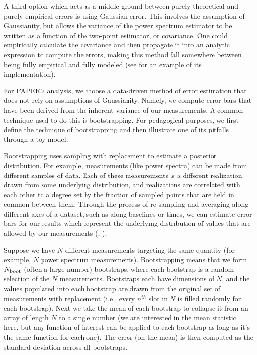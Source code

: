 \documentclass[preprint2,numberedappendix,tighten]{aastex6}  %
\begin{document}
A third option which acts as a middle ground between purely theoretical and purely empirical errors is using Gaussian error. This involves the assumption of Gaussianity, but allows the variance of the power spectrum estimator to be written as a function of the two-point estimator, or covariance. One could empirically calculate the covariance and then propagate it into an analytic expression to compute the errors, making this method fall somewhere between being fully empirical and fully modeled (see \citet{das_et_al2011a} for an example of its implementation). 

For PAPER's analysis, we choose a data-driven method of error estimation that does not rely on assumptions of Gaussianity. Namely, we compute error bars that have been derived from the inherent 
variance of our measurements. A common technique used to do this is bootstrapping. For pedagogical purposes, we first define the technique of 
bootstrapping and then illustrate one of its pitfalls through a toy model.

Bootstrapping uses sampling with replacement to estimate a posterior distribution. For example, measurements (like power 
spectra) can be made from different samples of data. Each of these measurements is a different realization drawn from some underlying distribution, and realizations are correlated with each other to a degree set by the fraction of sampled points that are held in common 
between them. Through the process of re-sampling and averaging along different axes of a dataset, such as along baselines or times, we can estimate error bars for 
our results which represent the underlying distribution of values that are allowed by our measurements (\citealt{efron_tibshirani1994}; \citealt{andrae2010}).

Suppose we have $N$ different measurements targeting the same quantity (for example, $N$ power spectrum measurements). 
Bootstrapping means that we form $N_{\rm boot}$ (often a large number) bootstraps, where each bootstrap is a random selection 
of the $N$ measurements. Bootstraps each have dimensions of $N$, and the values populated into each bootstrap are drawn 
from the original set of measurements with replacement (i.e., every $n^{th}$ slot in $N$ is filled randomly for each bootstrap). Next we take 
the mean of each bootstrap to collapse it from an array of length $N$ to a single number (we are interested in the mean statistic 
here, but any function of interest can be applied to each bootstrap as long as it's the same function for each one). The error (on 
the mean) is then computed as the standard deviation across all bootstraps. 
\end{document}
